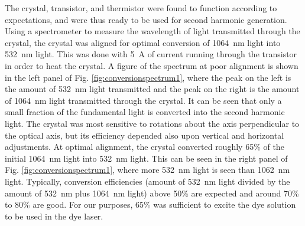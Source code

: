 The crystal, transistor, and thermistor were found to function according to expectations, and were thus ready to be used for second harmonic generation. Using a spectrometer to measure the wavelength of light transmitted through the crystal, the crystal was aligned for optimal conversion of \SI{1064}{\nano \meter} light into \SI{532}{\nano \meter} light. This was done with \SI{5}{ A} of current running through the transistor in order to heat the crystal. A figure of the spectrum at poor alignment is shown in the left panel of Fig. \ref{fig:conversionspectrum1}, where the peak on the left is the amount of \SI{532}{\nano \meter} light transmitted and the peak on the right is the amount of \SI{1064}{\nano \meter} light transmitted through the crystal. It can be seen that only a small fraction of the fundamental light is converted into the second harmonic light. The crystal was most sensitive to rotations about the axis perpendicular to the optical axis, but its efficiency depended also upon vertical and horizontal adjustments. At optimal alignment, the crystal converted roughly 65\% of the initial \SI{1064}{\nano \meter} light into \SI{532}{\nano \meter} light. This can be seen in the right panel of Fig. \ref{fig:conversionspectrum1}, where more \SI{532}{\nano \meter} light is seen than \SI{1062}{\nano \meter} light. Typically, conversion efficiencies (amount of \SI{532}{\nano \meter} light divided by the amount of \SI{532}{\nano \meter} plus \SI{1064}{\nano \meter} light) above 50\% are expected and around 70\% to 80\% are good. For our purposes, 65\% was sufficient to excite the dye solution to be used in the dye laser.

